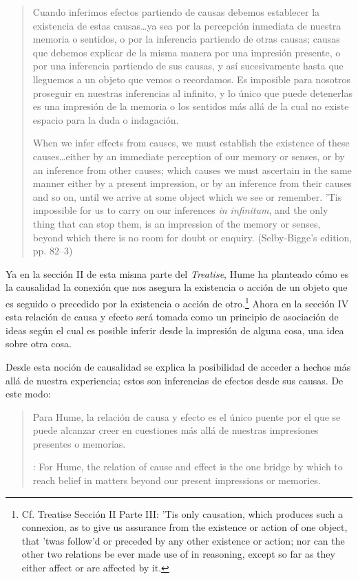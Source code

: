 \blockquote[{\cite[86]{anscombe1981hjc}}When we infer effects from causes, we
must establish the existence of these causes\ldots either by an immediate
perception of our memory or senses, or by an inference from other causes; which
causes we must ascertain in the same manner either by a present impression, or
by an inference from their causes and so on, until we arrive at some object
which we see or remember. 'Tis impossible for us to carry on our inferences
\emph{in infinitum}, and the only thing that can stop them, is an impression of
the memory or senses, beyond which there is no room for doubt or enquiry.
(Selby-Bigge's edition, pp. 82--3)]{Cuando inferimos efectos partiendo de causas
  debemos establecer la existencia de estas causas\ldots ya sea por la
  percepción inmediata de nuestra memoria o sentidos, o por la inferencia
  partiendo de otras causas; causas que debemos explicar de la misma manera por
  una impresión presente, o por una inferencia partiendo de sus causas, y así
  sucesivamente hasta que lleguemos a un objeto que vemos o recordamos. Es
  imposible para nosotros proseguir en nuestras inferencias al infinito, y lo
  único que puede detenerlas es una impresión de la memoria o los sentidos más
  allá de la cual no existe espacio para la duda o indagación.}

Ya en la sección II de esta misma parte del \emph{Treatise}, Hume ha planteado
cómo es la causalidad la conexión que nos asegura la existencia o acción de un
objeto que es seguido o precedido por la existencia o acción de
otro.\footnote{Cf. Treatise Sección II Parte III: ’Tis only causation, which
  produces such a connexion, as to give us assurance from the existence or
  action of one object, that ’twas follow’d or preceded by any other existence
  or action; nor can the other two relations be ever made use of in reasoning,
  except so far as they either affect or are affected by it. }
Ahora en la sección IV esta relación de causa y efecto será tomada como un
principio de asociación de ideas según el cual es posible inferir desde la
impresión de alguna cosa, una idea sobre otra cosa.

Desde esta noción de causalidad se explica la posibilidad de acceder a hechos
más allá de nuestra experiencia; estos son inferencias de efectos desde sus
causas. De este modo: \blockquote[{\cite[87]{anscombe1981hjc}}: For Hume, the
relation of cause and effect is the one bridge by which to reach belief in
matters beyond our present impressions or memories.]{Para Hume, la relación de
  causa y efecto es el único puente por el que se puede alcanzar creer en
  cuestiones más allá de nuestras impresiones presentes o memorias.}

